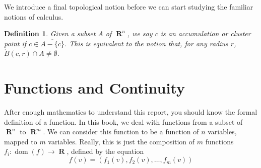 \documentclass{report}
\newtheorem{definition}{Definition}
\DeclareMathOperator{\real}{\mathbf{R}}
\DeclareMathOperator{\dom}{dom}
\begin{document}
We introduce a final topological notion before we can start studying the familiar notions of calculus.

\begin{definition}
  Given a subset $A$ of $\real^n$, we say $c$ is an accumulation or cluster point if $c \in \overline{A - \{c\}}$. This is equivalent to the notion that, for any radius $r$, $\mathring{B}(c,r) \cap A \neq \emptyset$.
\end{definition}










\chapter{Functions and Continuity}

After enough mathematics to understand this report, you should know the formal definition of a function. In this book, we deal with functions from a subset of $\real^n$ to $\real^m$. We can consider this function to be a function of $n$ variables, mapped to $m$ variables. Really, this is just the composition of $m$ functions $f_i:\dom(f) \to \real$, defined by the equation
%
\[ f(v) = (f_1(v), f_2(v), \dots, f_m(v)) \]
\end{document}
